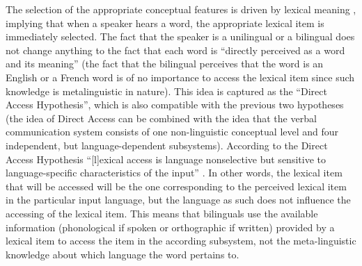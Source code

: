 The selection of the appropriate conceptual features is driven by lexical meaning \citep[203]{paradis_neurolinguistic_2004}, implying that when a speaker hears a word, the appropriate lexical item is immediately selected. The fact that the speaker is a unilingual or a bilingual does not change anything to the fact that each word is “directly perceived as a word and its meaning” \citep[203]{paradis_neurolinguistic_2004} (the fact that the bilingual perceives that the word is an English or a French word is of no importance to access the lexical item since such knowledge is metalinguistic in nature). This idea is captured as the “Direct Access Hypothesis”, which is also compatible with the previous two hypotheses (the idea of Direct Access can be combined with the idea that the verbal communication system consists of one non-linguistic conceptual level and four independent, but language-dependent subsystems). According to the Direct Access Hypothesis “[l]exical access is language nonselective but sensitive to language-specific characteristics of the input” \citep[205]{paradis_neurolinguistic_2004}. In other words, the lexical item that will be accessed will be the one corresponding to the perceived lexical item in the particular input language, but the language as such does not influence the accessing of the lexical item. This means that bilinguals use the available information (phonological if spoken or orthographic if written) provided by a lexical item to access the item in the according subsystem, not the meta-linguistic knowledge about which language the word pertains to.

